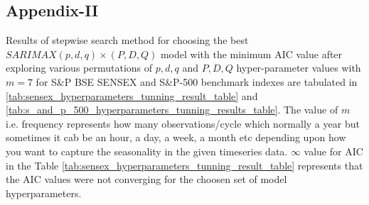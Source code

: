 \documentclass[conference]{IEEEtran}
\begin{document}
\subsection{Appendix-II}
Results of stepwise search method for choosing the best $SARIMAX(p, d, q) \times (P, D, Q)$ model with the minimum AIC value after exploring various permutations of $p, d, q$ and $P, D, Q$ hyper-parameter values with $m = 7$ for S\&P BSE SENSEX and S\&P-500 benchmark indexes are tabulated in \ref{tab:sensex_hyperparameters_tunning_result_table} and \ref{tab:s_and_p_500_hyperparameters_tunning_results_table}. The value of $m$ i.e. frequency represents how many observations/cycle which normally a year but sometimes it cab be an hour, a day, a week, a month etc depending upon how you want to capture the seasonality in the given timeseries data. $\infty$ value for AIC in the Table \ref{tab:sensex_hyperparameters_tunning_result_table} represents that the AIC values were not converging for the choosen set of model hyperparameters.
\end{document}

